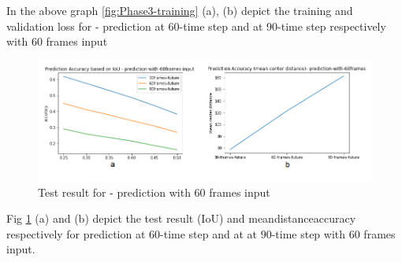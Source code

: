 In the above graph \ref{fig:Phase3-training} (a), (b) depict the training and validation loss for - prediction at 60-time step and at 90-time step respectively with 60 frames input \\




\begin{figure}[H] 
\includegraphics[scale=0.8]{Phase3-accuracy}
\begin{center}
\caption{Test result for - prediction with 60 frames input}
\label{Phase3-accuracy}
\end{center}
\end{figure}

Fig \ref{Phase3-accuracy} (a) and (b) depict the test result (IoU) and mean\textunderscore distance\textunderscore accuracy respectively for prediction at 60-time step and at at 90-time step with 60 frames input. 


